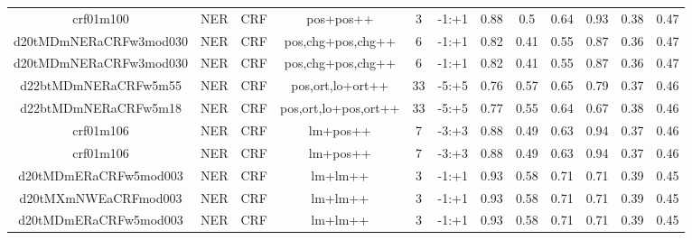 \documentclass[a4paper]{article}
\begin{document}
\begin{landscape}
\begin{center}
\begin{tabular}{ |c|c|c|c|c|c|c|c|c|c|c|c|}
 
 	
 	\small{ crf01m100 } & \small{ NER} & \small{  CRF }  & pos+pos++  &  3 &  \small{  -1:+1 }  &  0.88 & 0.5 & 0.64  &  0.93 & 0.38 & 0.47 \\
 	

 
 	
 	\small{ d20tMDmNERaCRFw3mod030 } & \small{ NER} & \small{  CRF }  & pos,chg+pos,chg++  &  6 &  \small{  -1:+1 }  &  0.82 & 0.41 & 0.55  &  0.87 & 0.36 & 0.47 \\
 	

 
 	
 	\small{ d20tMDmNERaCRFw3mod030 } & \small{ NER} & \small{  CRF }  & pos,chg+pos,chg++  &  6 &  \small{  -1:+1 }  &  0.82 & 0.41 & 0.55  &  0.87 & 0.36 & 0.47 \\
 	

 
 	
 	\small{ d22btMDmNERaCRFw5m55 } & \small{ NER} & \small{  CRF }  & pos,ort,lo+ort++  &  33 &  \small{  -5:+5 }  &  0.76 & 0.57 & 0.65  &  0.79 & 0.37 & 0.46 \\
 	

 
 	
 	\small{ d22btMDmNERaCRFw5m18 } & \small{ NER} & \small{  CRF }  & pos,ort,lo+pos,ort++  &  33 &  \small{  -5:+5 }  &  0.77 & 0.55 & 0.64  &  0.67 & 0.38 & 0.46 \\
 	

 
 	
 	\small{ crf01m106 } & \small{ NER} & \small{  CRF }  & lm+pos++  &  7 &  \small{  -3:+3 }  &  0.88 & 0.49 & 0.63  &  0.94 & 0.37 & 0.46 \\
 	

 
 	
 	\small{ crf01m106 } & \small{ NER} & \small{  CRF }  & lm+pos++  &  7 &  \small{  -3:+3 }  &  0.88 & 0.49 & 0.63  &  0.94 & 0.37 & 0.46 \\
 	

 
 	
 	\small{ d20tMDmERaCRFw5mod003 } & \small{ NER} & \small{  CRF }  & lm+lm++  &  3 &  \small{  -1:+1 }  &  0.93 & 0.58 & 0.71  &  0.71 & 0.39 & 0.45 \\
 	

 
 	
 	\small{ d20tMXmNWEaCRFmod003 } & \small{ NER} & \small{  CRF }  & lm+lm++  &  3 &  \small{  -1:+1 }  &  0.93 & 0.58 & 0.71  &  0.71 & 0.39 & 0.45 \\
 	

 
 	
 	\small{ d20tMDmERaCRFw5mod003 } & \small{ NER} & \small{  CRF }  & lm+lm++  &  3 &  \small{  -1:+1 }  &  0.93 & 0.58 & 0.71  &  0.71 & 0.39 & 0.45 \\
 	


\end{tabular}
\end{center}
\end{landscape}
\end{document}
